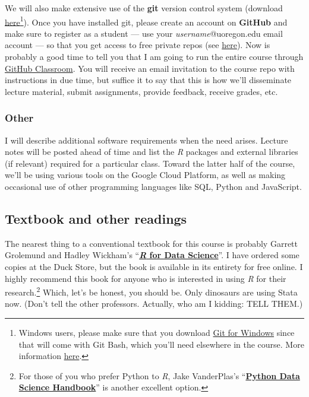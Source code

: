 \documentclass[12]{article}
\begin{document}
We will also make extensive use of the \textbf{git} version control system (download \href{https://git-scm.com/downloads}{here}\footnote{Windows users, please make sure that you download \href{https://gitforwindows.org/}{Git for Windows} since that will come with Git Bash, which you'll need elsewhere in the course. More information \href{http://happygitwithr.com/install-git.html\#install-git-windows}{here}.}). %
Once you have installed git, please create an account on \textbf{GitHub} and make sure to register as a student --- use your \textit{username}@uoregon.edu email account --- so that you get access to free private repos (see \href{https://education.github.com/discount_requests/new}{here}). Now is probably a good time to tell you that I am going to run the entire course through \href{https://classroom.github.com/}{GitHub Classroom}. You will receive an email invitation to the course repo with instructions in due time, but suffice it to say that this is how we'll disseminate lecture material, submit assignments, provide feedback, receive grades, etc.

\vspace{-0.25cm}
\subsubsection*{Other}

I will describe additional software requirements when the need arises. Lecture notes will be posted ahead of time and list the \textit{R} packages and external libraries (if relevant) required for a particular class. Toward the latter half of the course, we'll be using various tools on the Google Cloud Platform, as well as making occasional use of other programming languages like SQL, Python and JavaScript.

\subsection*{Textbook and other readings}

The nearest thing to a conventional textbook for this course is probably Garrett Grolemund and Hadley Wickham's ``\href{http://r4ds.had.co.nz}{\textbf{\textit{R} for Data Science}}''. I have ordered some copies at the Duck Store, but the book is available in its entirety for free online. I highly recommend this book for anyone who is interested in using \textit{R} for their research.\footnote{For those of you who prefer Python to \textit{R}, Jake VanderPlas's ``\href{https://jakevdp.github.io/PythonDataScienceHandbook/}{\textbf{Python Data Science Handbook}}'' is another excellent option.} Which, let's be honest, you should be. Only dinosaurs are using Stata now. (Don't tell the other professors. Actually, who am I kidding: TELL THEM.)
\end{document}
